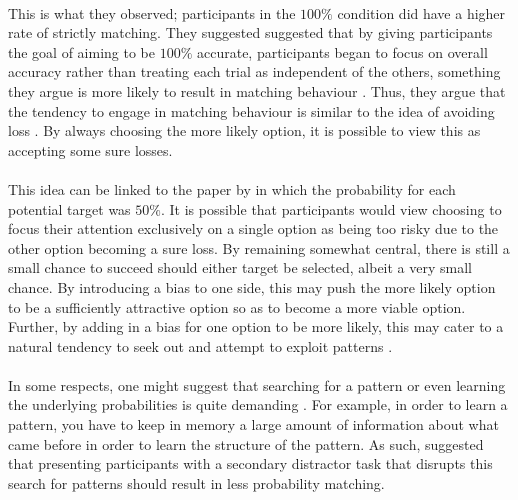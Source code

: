 \documentclass[12pt]{article}
\begin{document}
\paragraph{} This is what they observed; participants in the $100\%$ condition did have a higher rate of strictly matching. They suggested suggested that by giving participants the goal of aiming to be $100\%$ accurate, participants began to focus on overall accuracy rather than treating each trial as independent of the others, something they argue is more likely to result in matching behaviour \citep{Gao2015}. Thus, they argue that the tendency to engage in matching behaviour is similar to the idea of avoiding loss \citep{KahnemanProspect}. By always choosing the more likely option, it is possible to view this as accepting some sure losses.

\paragraph{} This idea can be linked to the paper by \cite{clarke2015failure} in which the probability for each potential target was $50\%$. It is possible that participants would view choosing to focus their attention exclusively on a single option as being too risky due to the other option becoming a sure loss. By remaining somewhat central, there is still a small chance to succeed should either target be selected, albeit a very small chance. By introducing a bias to one side, this may push the more likely option to be a sufficiently attractive option so as to become a more viable option. Further, by adding in a bias for one option to be more likely, this may cater to a natural tendency to seek out and attempt to exploit patterns \citep{gaissmaier2008smart,yellott1969probability}.

\paragraph{} In some respects, one might suggest that searching for a pattern \citep{wolford2004searching} or even learning the underlying probabilities is quite demanding \citep{kahneman1982judgement}. For example, in order to learn a pattern, you have to keep in memory a large amount of information about what came before in order to learn the structure of the pattern. As such, \cite{wolford2004searching} suggested that presenting participants with a secondary distractor task that disrupts this search for patterns should result in less probability matching. %
\end{document}
